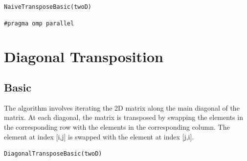 \documentclass[conference]{IEEEtran}
\begin{document}
\begin{algorithm}




\caption{\texttt{NaiveTransposeBasic(twoD)}}
\texttt{\#pragma omp parallel}{\\
}
\label{2}
\end{algorithm}

\section{Diagonal Transposition}
\subsection{Basic}
The algorithm involves iterating the 2D matrix along the main diagonal of the matrix. At each diagonal, the matrix is transposed by swapping the elements in the corresponding row with the elements in the corresponding column. The element at index [i,j] is swapped with the element at index [j,i]. 

\begin{algorithm}




\caption{\texttt{DiagonalTransposeBasic(twoD)}}
\label{basic}
\end{algorithm}
\end{document}
